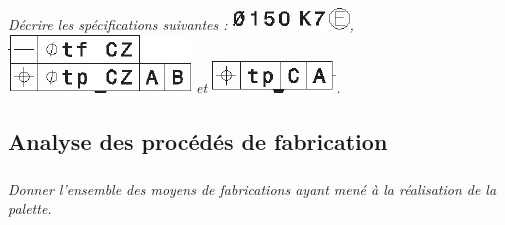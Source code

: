 \documentclass[10pt,fleqn]{article} %
\begin{document}
\subparagraph{}
\textit{Décrire les spécifications suivantes :
\includegraphics{images/gps_01}, \includegraphics{images/gps_02} et  \includegraphics{images/gps_03}.}

\subsection*{Analyse des procédés de fabrication}
\subparagraph{}
\textit{Donner l'ensemble des moyens de fabrications ayant mené à la réalisation de la palette.}

\end{document}
